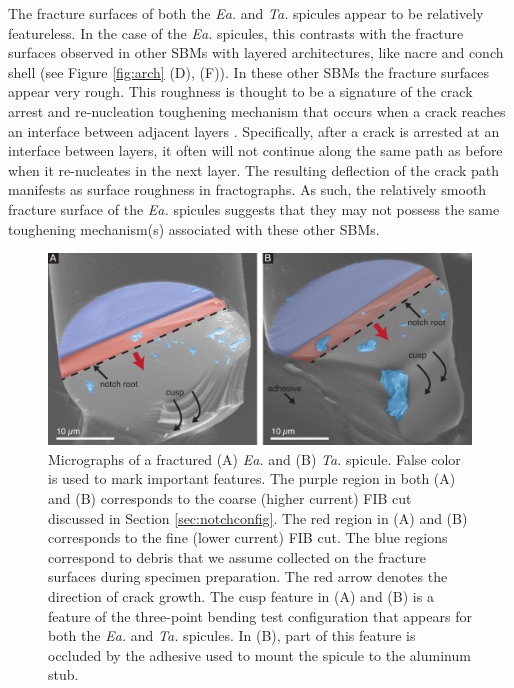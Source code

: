 \documentclass[12pt,onecolumn]{article}
\makeatletter
\newcommand{\TA}{\textit{Ta.\@}\xspace}
\newcommand{\EA}{\textit{Ea.\@}\xspace}
\makeatother
\begin{document}
\begin{bibunit}
 The fracture surfaces of both the \EA and \TA spicules appear to be relatively featureless. In the case of the \EA spicules, this contrasts with the fracture surfaces observed in other SBMs with layered architectures, like nacre and conch shell (see Figure \ref{fig:arch} (D), (F)). In these other SBMs the fracture surfaces appear very rough. This roughness is thought to be a signature of the crack arrest and re-nucleation toughening mechanism that occurs when a crack reaches an interface between adjacent layers \cite{karambelas2013strombus, koester2008true,liu2000bending,barthelat2009review}. Specifically, after a crack is arrested at an interface between layers, it often will not continue along the same path as before when it re-nucleates in the next layer. The resulting deflection of the crack path manifests as surface roughness in fractographs. As such, the relatively smooth fracture surface of the \EA spicules suggests that they may not possess the same toughening mechanism(s) associated with these other SBMs.
%
\begin{figure}[ht!]
			\centering
			\includegraphics[width=\textwidth]{../Figures/FigureFract/Figure4_V4B.pdf}
			\caption{Micrographs of a fractured (A) \EA and (B) \TA spicule. False color is used to mark important features. The purple region in both (A) and (B) corresponds to the coarse (higher current) FIB cut discussed in Section \ref{sec:notchconfig}. The red region in (A) and (B) corresponds to the fine (lower current) FIB cut. The blue regions correspond to debris that we assume collected on the fracture surfaces during specimen preparation. The red arrow denotes the direction of crack growth. The cusp feature in (A) and (B) is a feature of the three-point bending test configuration that appears for both the \EA and \TA spicules. In (B), part of this feature is occluded by the adhesive used to mount the spicule to the aluminum stub.}
			\label{fig:fract}
			\end{figure}


\end{bibunit}
\end{document}
